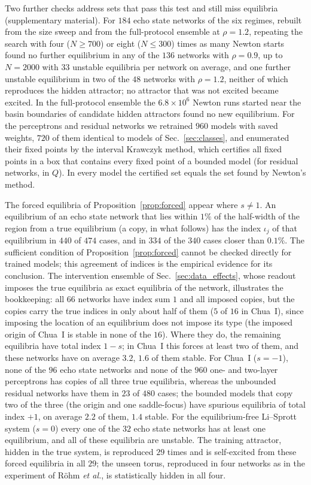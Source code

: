 Two further checks address sets that pass this test and still miss equilibria (supplementary material). For $184$ echo
state networks of the six regimes, rebuilt from the size sweep and from the full-protocol ensemble at $\rho=1.2$, repeating
the search with four ($N\ge700$) or eight ($N\le300$) times as many Newton starts found no further equilibrium in any of the
$136$ networks with $\rho=0.9$, up to $N=2000$ with $33$ unstable equilibria per network on average, and one further unstable
equilibrium in two of the $48$ networks with $\rho=1.2$, neither of which reproduces the hidden attractor; no attractor that
was not excited became excited. In the full-protocol ensemble the $6.8\times10^6$ Newton runs started near the basin
boundaries of candidate hidden attractors found no new equilibrium. For the perceptrons and residual networks we retrained
$960$ models with saved weights, $720$ of them identical to models of Sec.~\ref{sec:classes}, and enumerated their fixed
points by the interval Krawczyk method,\cite{Krawczyk1969Newton,Moore2009Interval} which certifies all fixed points in a box
that contains every fixed point of a bounded model (for residual networks, in $Q$). In every model the certified set equals
the set found by Newton's method.

The forced equilibria of Proposition~\ref{prop:forced} appear where $s\neq1$. An equilibrium of an echo state network that
lies within $1\%$ of the half-width of the region from a true equilibrium (a copy, in what follows) has the index $\iota_j$
of that equilibrium in $440$ of $474$ cases, and in $334$ of the $340$ cases closer than $0.1\%$. The sufficient condition of
Proposition~\ref{prop:forced} cannot be checked directly for trained models; this agreement of indices is the empirical
evidence for its conclusion. The intervention ensemble of Sec.~\ref{sec:data_effects}, whose readout imposes the true
equilibria as exact equilibria of the network, illustrates the bookkeeping: all $66$ networks have index sum $1$ and all
imposed copies, but the copies carry the true indices in only about half of them ($5$ of $16$ in Chua~I), since imposing
the location of an equilibrium does not impose its type (the imposed origin of Chua~I is stable in none of the $16$). Where
they do, the remaining equilibria have total index $1-s$; in Chua~I this forces at least two of them, and these networks
have on average $3.2$, $1.6$ of them stable. For Chua~I ($s=-1$), none of the $96$ echo state
networks and none of the $960$ one- and two-layer perceptrons has copies of all three true equilibria, whereas the
unbounded residual networks have them in $23$ of $480$ cases; the bounded models that copy two of the three (the origin and
one saddle-focus) have spurious equilibria of total index $+1$, on average $2.2$ of them, $1.4$ stable. For the
equilibrium-free Li--Sprott system ($s=0$) every one of the $32$ echo state networks has at least one equilibrium, and all
of these equilibria are unstable. The training attractor, hidden in the true system, is reproduced $29$ times and is
self-excited from these forced equilibria in all $29$; the unseen torus, reproduced in four networks as in the experiment of
R\"ohm \textit{et al.},\cite{Rohm2021} is statistically hidden in all four.

